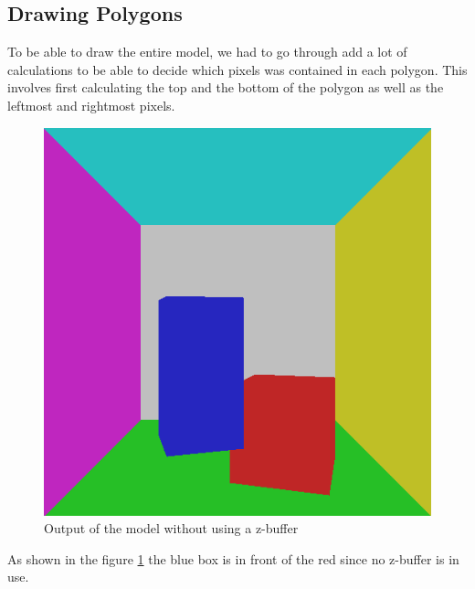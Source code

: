 \documentclass[a4paper,11pt]{article}
\begin{document}
\subsection{Drawing Polygons}
To be able to draw the entire model, we had to go through add a lot of calculations to be able to decide which pixels was contained in each polygon. This involves first calculating the top and the bottom of the polygon as well as the leftmost and rightmost pixels.   

\begin{figure}[h!]
	\centering	
	\includegraphics[width=0.4\linewidth]{screenshot15.png}
	\caption{Output of the model without using a z-buffer}
	\label{fig15}
\end{figure}

As shown in the figure \ref{fig15} the blue box is in front of the red since no z-buffer is in use.
\end{document}
